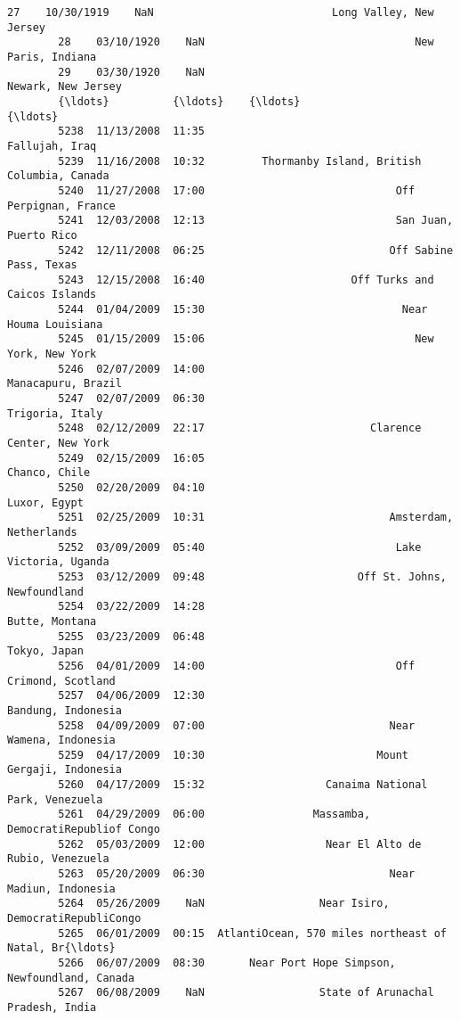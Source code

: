 \documentclass[11pt]{article}
\begin{document}
\begin{Verbatim}[commandchars=\\\{\}]
        27    10/30/1919    NaN                            Long Valley, New Jersey   
        28    03/10/1920    NaN                                 New Paris, Indiana   
        29    03/30/1920    NaN                                 Newark, New Jersey   
        {\ldots}          {\ldots}    {\ldots}                                                {\ldots}   
        5238  11/13/2008  11:35                                     Fallujah, Iraq   
        5239  11/16/2008  10:32         Thormanby Island, British Columbia, Canada   
        5240  11/27/2008  17:00                              Off Perpignan, France   
        5241  12/03/2008  12:13                              San Juan, Puerto Rico   
        5242  12/11/2008  06:25                             Off Sabine Pass, Texas   
        5243  12/15/2008  16:40                       Off Turks and Caicos Islands   
        5244  01/04/2009  15:30                               Near Houma Louisiana   
        5245  01/15/2009  15:06                                 New York, New York   
        5246  02/07/2009  14:00                                 Manacapuru, Brazil   
        5247  02/07/2009  06:30                                    Trigoria, Italy   
        5248  02/12/2009  22:17                          Clarence Center, New York   
        5249  02/15/2009  16:05                                      Chanco, Chile   
        5250  02/20/2009  04:10                                       Luxor, Egypt   
        5251  02/25/2009  10:31                             Amsterdam, Netherlands   
        5252  03/09/2009  05:40                              Lake Victoria, Uganda   
        5253  03/12/2009  09:48                        Off St. Johns, Newfoundland   
        5254  03/22/2009  14:28                                     Butte, Montana   
        5255  03/23/2009  06:48                                       Tokyo, Japan   
        5256  04/01/2009  14:00                              Off Crimond, Scotland   
        5257  04/06/2009  12:30                                 Bandung, Indonesia   
        5258  04/09/2009  07:00                             Near Wamena, Indonesia   
        5259  04/17/2009  10:30                           Mount Gergaji, Indonesia   
        5260  04/17/2009  15:32                   Canaima National Park, Venezuela   
        5261  04/29/2009  06:00                 Massamba, DemocratiRepubliof Congo   
        5262  05/03/2009  12:00                   Near El Alto de Rubio, Venezuela   
        5263  05/20/2009  06:30                             Near Madiun, Indonesia   
        5264  05/26/2009    NaN                  Near Isiro, DemocratiRepubliCongo   
        5265  06/01/2009  00:15  AtlantiOcean, 570 miles northeast of Natal, Br{\ldots}   
        5266  06/07/2009  08:30       Near Port Hope Simpson, Newfoundland, Canada   
        5267  06/08/2009    NaN                  State of Arunachal Pradesh, India   
        

\end{Verbatim}
\end{document}
